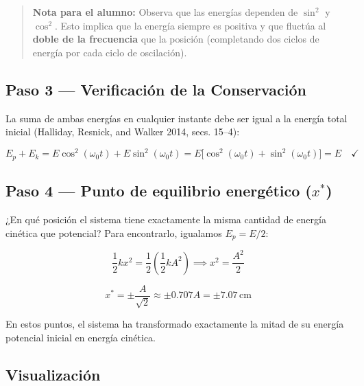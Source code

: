 \documentclass[
  letterpaper,
  DIV=11,
  numbers=noendperiod]{scrreprt}
\begin{document}
\begin{quote}
\textbf{Nota para el alumno:} Observa que las energías dependen de
\(\sin^2\) y \(\cos^2\). Esto implica que la energía siempre es positiva
y que fluctúa al \textbf{doble de la frecuencia} que la posición
(completando dos ciclos de energía por cada ciclo de oscilación).
\end{quote}

\subsection{Paso 3 --- Verificación de la
Conservación}\label{paso-3-verificaciuxf3n-de-la-conservaciuxf3n}

La suma de ambas energías en cualquier instante debe ser igual a la
energía total inicial (Halliday, Resnick, and Walker 2014, secs. 15--4):

\[
E_p + E_k = E\cos^2(\omega_0 t) + E\sin^2(\omega_0 t) = E\bigl[\cos^2(\omega_0 t) + \sin^2(\omega_0 t)\bigr] = E \quad \checkmark
\]

\subsection{\texorpdfstring{Paso 4 --- Punto de equilibrio energético
(\(x^*\))}{Paso 4 --- Punto de equilibrio energético (x\^{}*)}}\label{paso-4-punto-de-equilibrio-energuxe9tico-x}

¿En qué posición el sistema tiene exactamente la misma cantidad de
energía cinética que potencial? Para encontrarlo, igualamos
\(E_p = E/2\):

\[
\frac{1}{2}kx^2 = \frac{1}{2} \left( \frac{1}{2}kA^2 \right) \implies x^2 = \frac{A^2}{2}
\]

\[
x^* = \pm\frac{A}{\sqrt{2}} \approx \pm 0.707 A = \pm 7.07\,\text{cm}
\]

En estos puntos, el sistema ha transformado exactamente la mitad de su
energía potencial inicial en energía cinética.

\subsection{Visualización}\label{visualizaciuxf3n-1}
\end{document}
